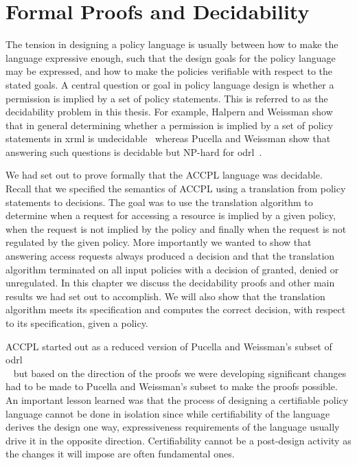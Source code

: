 \chapter{Formal Proofs and Decidability}\label{chap:results}

                  
The tension in designing a policy language is usually between how to make the language expressive enough, such that the design goals for the policy language may be expressed, and how to make the policies verifiable with respect to the stated goals. A central question or goal in policy language design is whether a permission is implied by a set of policy statements. This is referred to as the decidability problem in this thesis. For example, Halpern and Weissman show that in general determining whether a permission is implied by a set of policy statements in \ac{xrml} is undecidable~\cite{HalpernW08} whereas Pucella and Weissman show that answering such questions is decidable but NP-hard for \ac{odrl}~\cite{pucella2006}.
 

We had set out to prove formally that the \ac{ACCPL} language was decidable. Recall that we specified the semantics of \ac{ACCPL} using a translation from policy statements to decisions. The goal was to use the translation algorithm to determine when a request for accessing a resource is implied by a given policy, when the request is not implied by the policy and finally when the request is not regulated by the given policy. More importantly we wanted to show that answering access requests always produced a decision and that the translation algorithm terminated on all input policies with a decision of granted, denied or unregulated. In this chapter we discuss the decidability proofs and other main results we had set out to accomplish. We will also show that the translation algorithm meets its specification and computes the correct decision, with respect to its specification, given a policy. 


\ac{ACCPL} started out as a reduced version of Pucella and Weissman's subset of \ac{odrl}\\~\cite{pucella2006} but based on the direction of the proofs we were developing significant changes had to be made to Pucella and Weissman's subset to make the proofs possible. An important lesson learned was that the process of designing a certifiable policy language cannot be done in isolation since while certifiability of the language derives the design one way, expressiveness requirements of the language usually drive it in the opposite direction. Certifiability cannot be a post-design activity as the changes it will impose are often fundamental ones.

